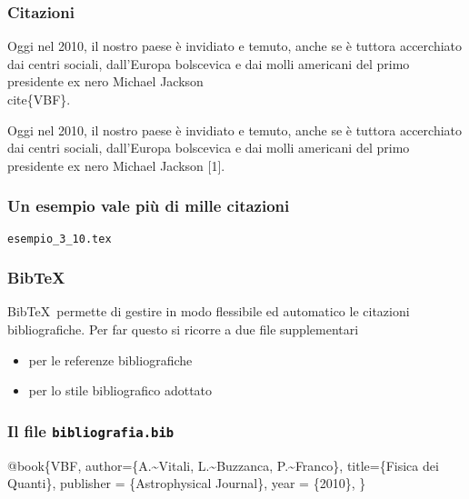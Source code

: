 \begin{frame}
  \frametitle{Citazioni}
	\begin{LaTeXcode}
		Oggi nel 2010, il nostro paese \`e invidiato e temuto, anche se \`e tuttora accerchiato dai centri sociali, dall'Europa bolscevica e dai molli americani del primo presidente ex nero Michael Jackson \alert{\\cite\{VBF\}}.
	\end{LaTeXcode}
	\begin{LaTeXoutput}
		Oggi nel 2010, il nostro paese \`e invidiato e temuto, anche se \`e tuttora accerchiato dai centri sociali, dall'Europa bolscevica e dai molli americani del primo presidente ex nero Michael Jackson [1].
	\end{LaTeXoutput}
\end{frame}
\begin{frame}
  \frametitle{Un esempio vale pi\`u di mille citazioni}
	\begin{center}
		\alert{\texttt{esempio\_3\_10.tex}}
	\end{center}
\end{frame}
\begin{frame}
  \frametitle{Bib\TeX}
	Bib\TeX\ permette di gestire in modo flessibile ed automatico le citazioni bibliografiche. 
	Per far questo si ricorre a due file supplementari
  \bigskip
	\begin{itemize}
		\item {} per le referenze bibliografiche
		\item {} per lo stile bibliografico adottato
	\end{itemize}
\end{frame}
\begin{frame}
  \frametitle{Il file \texttt{bibliografia.bib}}
	\begin{LaTeXcode}
		@book\{\alert{VBF},\n
		\hspace*{5ex} author=\{A.\textasciitilde Vitali, L.\textasciitilde Buzzanca, P.\textasciitilde Franco\},\n
		\hspace*{5ex} title=\{Fisica dei Quanti\},\n
		\hspace*{5ex} publisher = \{Astrophysical Journal\},\n
		\hspace*{5ex} year = \{2010\},\n
		\}
	\end{LaTeXcode}
\end{frame}
